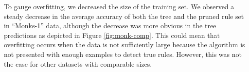 \documentclass[12pt]{article}
\begin{document}
To gauge overfitting, we decreased the size of the training set. We
observed a steady decrease in the average accuracy of both the tree
and the pruned rule set in ``Monks-1'' data, although the decrease was
more obvious in the tree predictions as depicted in Figure
\ref{fig:monk-comp}. This could mean that overfitting occurs when the
data is not sufficiently large because the algorithm is not presented
with enough examples to detect true rules. However, this was not the
case for other datasets with comparable sizes.
\end{document}
